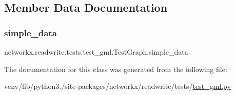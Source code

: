 \subsection{Member Data Documentation}
\mbox{\label{classnetworkx_1_1readwrite_1_1tests_1_1test__gml_1_1TestGraph_a9afb0d5ac06f225537adfbcc4e556a19}} 
\subsubsection{\texorpdfstring{simple\+\_\+data}{simple\_data}}
{\footnotesize\ttfamily networkx.\+readwrite.\+tests.\+test\+\_\+gml.\+Test\+Graph.\+simple\+\_\+data}



The documentation for this class was generated from the following file\+:\begin{DoxyCompactItemize}
\item 
venv/lib/python3./site-\/packages/networkx/readwrite/tests/\hyperlink{test__gml_8py}{test\+\_\+gml.\+py}\end{DoxyCompactItemize}
